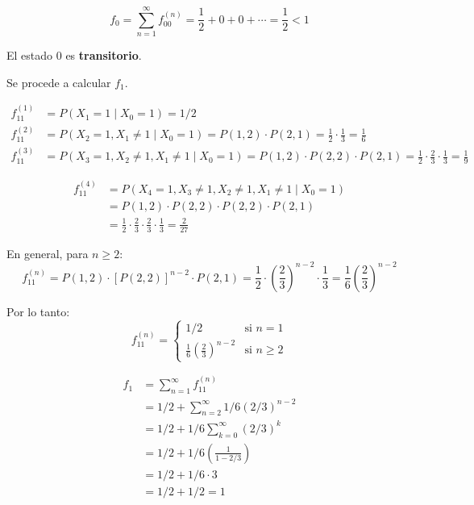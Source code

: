 \documentclass[12pt,a4paper]{article}
\begin{document}
\begin{equation*}
f_0 = \sum_{n=1}^{\infty} f_{00}^{(n)} = \frac{1}{2} + 0 + 0 + \cdots = \frac{1}{2} < 1
\end{equation*}

El estado $0$ es \textbf{transitorio}.

Se procede a calcular $f_1$.


\begin{align*}
f_{11}^{(1)} &= P(X_1=1 \mid X_0=1) = 1/2 \\
f_{11}^{(2)} &= P(X_2=1, X_1 \neq 1 \mid X_0=1) = P(1,2) \cdot P(2,1) = \frac{1}{2} \cdot \frac{1}{3} = \frac{1}{6} \\
f_{11}^{(3)} &= P(X_3=1, X_2 \neq 1, X_1 \neq 1 \mid X_0=1) = P(1,2) \cdot P(2,2) \cdot P(2,1) = \frac{1}{2} \cdot \frac{2}{3} \cdot \frac{1}{3} = \frac{1}{9}
\end{align*}

\begin{align*}
f_{11}^{(4)} &= P(X_4=1, X_3 \neq 1, X_2 \neq 1, X_1 \neq 1 \mid X_0=1) \\
&= P(1,2) \cdot P(2,2) \cdot P(2,2) \cdot P(2,1) \\
&= \frac{1}{2} \cdot \frac{2}{3} \cdot \frac{2}{3} \cdot \frac{1}{3} = \frac{2}{27}
\end{align*}

En general, para $n \geq 2$:
\begin{equation*}
f_{11}^{(n)} = P(1,2) \cdot [P(2,2)]^{n-2} \cdot P(2,1) = \frac{1}{2} \cdot \left(\frac{2}{3}\right)^{n-2} \cdot \frac{1}{3} = \frac{1}{6} \left(\frac{2}{3}\right)^{n-2}
\end{equation*}

Por lo tanto:
\begin{equation*}
f_{11}^{(n)} = \begin{cases}
1/2 & \text{si } n = 1 \\
\frac{1}{6} \left(\frac{2}{3}\right)^{n-2} & \text{si } n \geq 2
\end{cases}
\end{equation*}

\begin{align*}
f_1 &= \sum_{n=1}^{\infty} f_{11}^{(n)} \\
&= 1/2 + \sum_{n=2}^{\infty} 1/6 (2/3)^{n-2} \\
&= 1/2 + 1/6 \sum_{k=0}^{\infty} (2/3)^k \\
&= 1/2 + 1/6 \left(\frac{1}{1 - 2/3}\right) \\
&= 1/2 + 1/6 \cdot 3 \\
&= 1/2 + 1/2 = 1
\end{align*}
\end{document}
